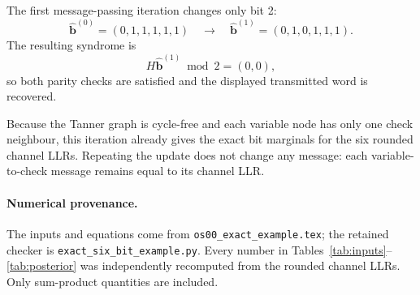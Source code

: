 \documentclass[11pt]{article}
\begin{document}
The first message-passing iteration changes only bit 2:
\begin{equation}
\widehat{\boldsymbol b}^{(0)}=(0,1,1,1,1,1)
\quad\longrightarrow\quad
\widehat{\boldsymbol b}^{(1)}=(0,1,0,1,1,1).
\end{equation}
The resulting syndrome is
\begin{equation}
H\widehat{\boldsymbol b}^{(1)}\bmod 2=(0,0),
\end{equation}
so both parity checks are satisfied and the displayed transmitted word is
recovered.

Because the Tanner graph is cycle-free and each variable node has only one
check neighbour, this iteration already gives the exact bit marginals for the
six rounded channel LLRs.  Repeating the update does not change any message:
each variable-to-check message remains equal to its channel LLR.

\paragraph{Numerical provenance.}
The inputs and equations come from \texttt{os00\_exact\_example.tex}; the
retained checker is \texttt{exact\_six\_bit\_example.py}.  Every number in
Tables~\ref{tab:inputs}--\ref{tab:posterior} was independently recomputed from
the rounded channel LLRs.  Only sum-product quantities are included.
\end{document}
